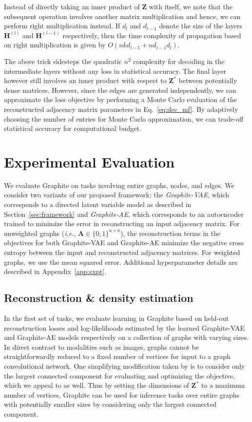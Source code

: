 \documentclass{article}
\newcommand{\name}{Graphite}
\begin{document}
Instead of directly taking an inner product of $\mathbf{Z}$ with itself, we note that the subsequent operation involves another matrix multiplication and hence, we can perform right multiplication instead.
If $d_l$ and $d_{l-1}$ denote the size of the layers $\mathbf{H}^{(l)}$ and $\mathbf{H}^{(l-1)}$ respectively, then the time complexity of propagation based on right multiplication is given by $O(nkd_{l-1} + nd_{l-1}d_l)$. 

The above trick sidesteps the quadratic $n^2$ complexity for decoding in the intermediate layers without any loss in statistical accuracy. The final layer however still involves an inner product with respect to $\mathbf{Z}^\ast$ between potentially dense matrices. However, since the edges are generated independently, we can approximate the loss objective by performing a Monte Carlo evaluation of the reconstructed adjacency matrix parameters in Eq.~\eqref{eq:dec_mf}. By adaptively choosing the number of entries for Monte Carlo approximation, we can trade-off statistical accuracy for computational budget.  
\section{Experimental Evaluation}\label{sec:exps}

We evaluate \name{} on tasks involving entire graphs, nodes, and edges. 
We consider two variants of our proposed framework: the \textit{\name{}-VAE}, which corresponds to a directed latent variable model as described in Section~\ref{sec:framework} and \textit{\name{}-AE}, which corresponds to an autoencoder trained to minimize the error in reconstructing an input adjacency matrix. For unweighted graphs (\textit{i.e.}, $\mathbf{A}\in \{0,1\}^{n \times n}$), the reconstruction terms in the objectives for both \name{}-VAE and \name{}-AE minimize the negative cross entropy between the input and reconstructed adjacency matrices. For weighted graphs, we use the mean squared error. Additional hyperparameter details are described in Appendix~\ref{app:expt}.


\subsection{Reconstruction \& density estimation}

In the first set of tasks, we evaluate learning in \name{} based on held-out reconstruction losses and log-likelihoods estimated by the learned \name{}-VAE and \name{}-AE models respectively on a collection of graphs with varying sizes. In direct contrast to modalities such as images, graphs cannot be straightforwardly reduced to a fixed number of vertices for input to a graph convolutional network. One simplifying modification taken by \citet{bojchevski2018netgan} is to consider only the largest connected component for evaluating and optimizing the objective, which we appeal to as well.  Thus by setting the dimensions of $\mathbf{Z}^*$ to a maximum number of vertices, \name{} can be used for inference tasks over entire graphs with potentially smaller sizes by considering only the largest connected component.
\end{document}
